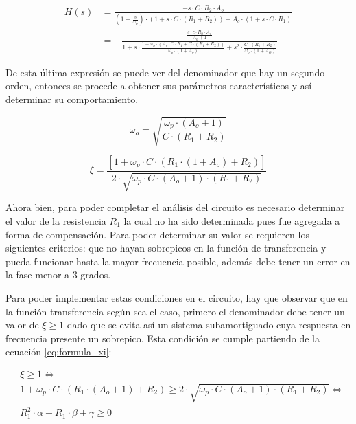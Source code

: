 \begin{align*}
	H(s) & = \frac{-s \cdot C \cdot R_2 \cdot A_o}{\left( 1 + \frac{s}{\omega_p} \right) \cdot \left( 1 + s \cdot C \cdot (R_1 + 	R_2) \right) + A_o \cdot(1+ s \cdot C \cdot R_1)} \\
	& = - \frac{ \frac{s \cdot c \cdot R_2 \cdot A_o}{A_o + 1} }{1 + s \cdot \frac{1+ \omega_p \cdot \left( A_o \cdot C \cdot R_1 + C \cdot ( R_1 + R_2) \right)}{\omega_p \cdot ( 1 + A_o)} + s^{2} \cdot \frac{C \cdot (R_1 + R_2)}{\omega_p \cdot (1+ A_O)}}
\end{align*}

De esta \'ultima expresi\'on se puede ver del denominador que hay un segundo orden, entonces se procede a obtener sus par\'ametros caracter\'isticos y as\'i determinar su comportamiento.

\begin{equation}
	\omega_o = \sqrt{\frac{\omega_p \cdot ( A_o + 1 ) }{C \cdot ( R_1 + R_2 ) }}
\end{equation}

\begin{equation}
	\xi = \frac{\left[ 1 + \omega_p \cdot C \cdot ( R_1 \cdot (1 + A_o) + R_2) \right] }{2 \cdot \sqrt{\omega_p \cdot C \cdot (A_o + 1) \cdot (R_1 + R_2)}}
	\label{eq:formula_xi}
\end{equation}

Ahora bien, para poder completar el an\'alisis del circuito es necesario determinar el valor de la resistencia $R_1$ la cual no ha sido determinada pues fue agregada a forma de compensaci\'on. Para poder determinar su valor se requieren los siguientes criterios: que no hayan sobrepicos en la funci\'on de transferencia y pueda funcionar hasta la mayor frecuencia posible, adem\'as debe tener un error en la fase menor a 3 grados.

Para poder implementar estas condiciones en el circuito, hay que observar que en la funci\'on transferencia seg\'un sea el caso, primero el denominador debe tener un valor de $\xi \geqslant{1}$ dado que se evita as\'i un sistema subamortiguado cuya respuesta en frecuencia presente un sobrepico. Esta condici\'on se cumple partiendo de la ecuaci\'on \ref{eq:formula_xi}:

\begin{align*}
	& \xi \geqslant{1} \Leftrightarrow \\
	& 1 + \omega_p \cdot C \cdot (R_1 \cdot (A_o + 1) + R_2) \geqslant 2 \cdot \sqrt{\omega_p \cdot C \cdot (A_o + 1) \cdot (R_1 + R_2)} \Leftrightarrow \\
	& R_1^{2} \cdot \alpha + R_1 \cdot \beta + \gamma \geqslant 0
\end{align*}

